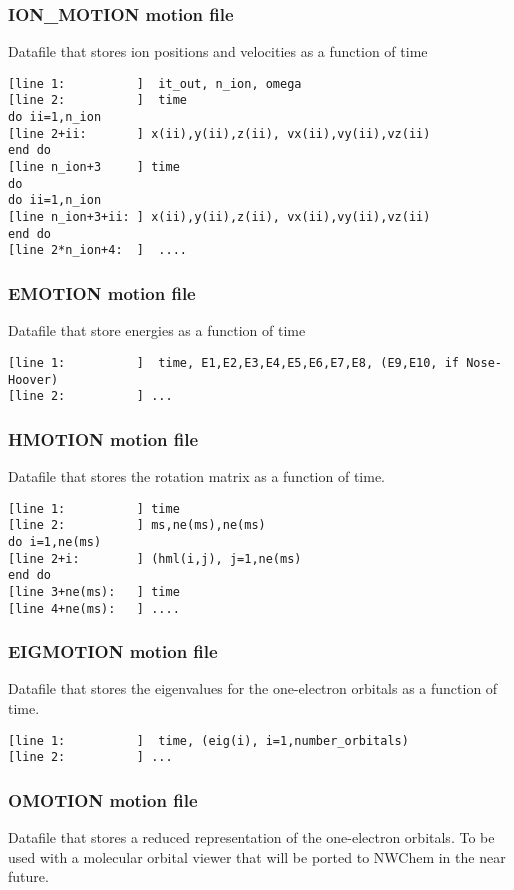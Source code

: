 \subsubsection{ION\_MOTION motion file}
Datafile that stores ion positions and velocities
as a function of time

\begin{verbatim}
[line 1:          ]  it_out, n_ion, omega
[line 2:          ]  time
do ii=1,n_ion
[line 2+ii:       ] x(ii),y(ii),z(ii), vx(ii),vy(ii),vz(ii)
end do
[line n_ion+3     ] time
do 
do ii=1,n_ion
[line n_ion+3+ii: ] x(ii),y(ii),z(ii), vx(ii),vy(ii),vz(ii)
end do
[line 2*n_ion+4:  ]  ....
\end{verbatim}

\subsubsection{EMOTION motion file}
Datafile that store energies as a function of time
\begin{verbatim}
[line 1:          ]  time, E1,E2,E3,E4,E5,E6,E7,E8, (E9,E10, if Nose-Hoover)
[line 2:          ] ...
\end{verbatim}


\subsubsection{HMOTION motion file}
Datafile that stores the rotation matrix
as a function of time.

\begin{verbatim}
[line 1:          ] time
[line 2:          ] ms,ne(ms),ne(ms)
do i=1,ne(ms)
[line 2+i:        ] (hml(i,j), j=1,ne(ms)
end do
[line 3+ne(ms):   ] time
[line 4+ne(ms):   ] ....
\end{verbatim}


\subsubsection{EIGMOTION motion file}
Datafile that stores the eigenvalues for the one-electron
orbitals as a function of time.

\begin{verbatim}
[line 1:          ]  time, (eig(i), i=1,number_orbitals)
[line 2:          ] ...
\end{verbatim}


\subsubsection{OMOTION motion file}
Datafile that stores a reduced representation of the
one-electron orbitals.  To be used with a molecular
orbital viewer that will be ported to NWChem
in the near future. 


